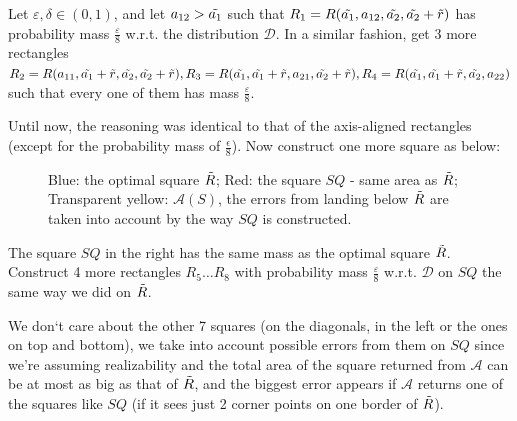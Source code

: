 \documentclass{article}
\newcommand{\<}{\langle}
\renewcommand{\>}{\rangle}
\theoremstyle{definition}
\begin{document}
Let $\varepsilon, \delta \in (0, 1)$, and let $a_{12}>\Tilde{a_1}$ such that $R_1=R(\Tilde{a_1}, a_{12}, \Tilde{a_2}, \Tilde{a_2}+\Tilde{r})$ has probability mass $\frac{\varepsilon}{8}$ w.r.t. the distribution $\mathcal{D}$. In a similar fashion, get 3 more rectangles $R_2 = R(a_{11}, \Tilde{a_1}+\Tilde{r}, \Tilde{a_2}, \Tilde{a_2}+\Tilde{r}), R_3 = R(\Tilde{a_1}, \Tilde{a_1}+\Tilde{r}, a_{21}, \Tilde{a_2}+\Tilde{r}), R_4 = R(\Tilde{a_1}, \Tilde{a_1}+\Tilde{r}, \Tilde{a_2}, a_{22})$ such that every one of them has mass $\frac{\varepsilon}{8}$. 

Until now, the reasoning was identical to that of the axis-aligned rectangles (except for the probability mass of $\frac{\epsilon}{8}$). Now construct one more square as below:

\begin{figure}
    \centering


  \caption{Blue: the optimal square $\Tilde{R}$; Red: the square $SQ$ - same area as $\Tilde{R}$; Transparent yellow: $\mathcal{A}(S)$, the errors from landing below $\Tilde{R}$ are taken into account by the way $SQ$ is constructed.}
  \label{fig:drawing}
\end{figure}

The square $SQ$ in the right has the same mass as the optimal square $\Tilde{R}$. Construct 4 more rectangles $R_5 \dots R_{8}$ with probability mass $\frac{\varepsilon}{8}$ w.r.t. $\mathcal{D}$ on $SQ$ the same way we did on $\Tilde{R}$. 

We don`t care about the other 7 squares (on the diagonals, in the left or the ones on top and bottom), we take into account possible errors from them on $SQ$ since we're assuming realizability and the total area of the square returned from $\mathcal{A}$ can be at most as big as that of $\Tilde{R}$, and the biggest error appears if $\mathcal{A}$ returns one of the squares like $SQ$ (if it sees just 2 corner points on one border of $\Tilde{R}$).
\end{document}

